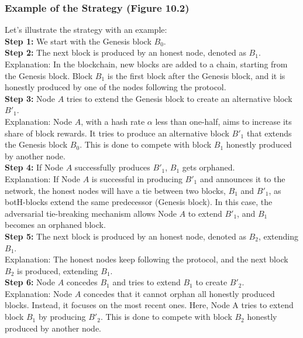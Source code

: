\subsubsection*{Example of the Strategy (Figure 10.2)}

Let's illustrate the strategy with an example:\\
\noindent
\textbf{Step 1:} We start with the Genesis block $B_0$.\\
\noindent
\textbf{Step 2:} The next block is produced by an honest node, denoted as $B_1$.\\
Explanation: In the blockchain, new blocks are added to a chain, starting from the Genesis block. Block $B_1$ is the first block after the Genesis block, and it is honestly produced by one of the nodes following the protocol.\\
\noindent
\textbf{Step 3:} Node $A$ tries to extend the Genesis block to create an alternative block $B'_1$.\\
Explanation: Node $A$, with a hash rate $\alpha$ less than one-half, aims to increase its share of block rewards. It tries to produce an alternative block $B'_1$ that extends the Genesis block $B_0$. This is done to compete with block $B_1$ honestly produced by another node.\\
\noindent
\textbf{Step 4:} If Node $A$ successfully produces $B'_{1}$, $B_1$ gets orphaned.\\
Explanation: If Node $A$ is successful in producing $B'_1$ and announces it to the network, the honest nodes will have a tie between two blocks, $B_1$ and $B'_1$, as botH-blocks extend the same predecessor (Genesis block). In this case, the adversarial tie-breaking mechanism allows Node $A$ to extend $B'_1$, and $B_1$ becomes an orphaned block.\\
\noindent
\textbf{Step 5:} The next block is produced by an honest node, denoted as $B_2$, extending $B_1$.\\
Explanation: The honest nodes keep following the protocol, and the next block $B_2$ is produced, extending $B_1$.\\
\noindent
\textbf{Step 6:} Node $A$ concedes $B_1$ and tries to extend $B_1$ to create $B'_{2}$.\\
Explanation: Node $A$ concedes that it cannot orphan all honestly produced blocks. Instead, it focuses on the most recent ones. Here, Node A tries to extend block $B_1$ by producing $B'_2$. This is done to compete with block $B_2$ honestly produced by another node.\\
\noindent
